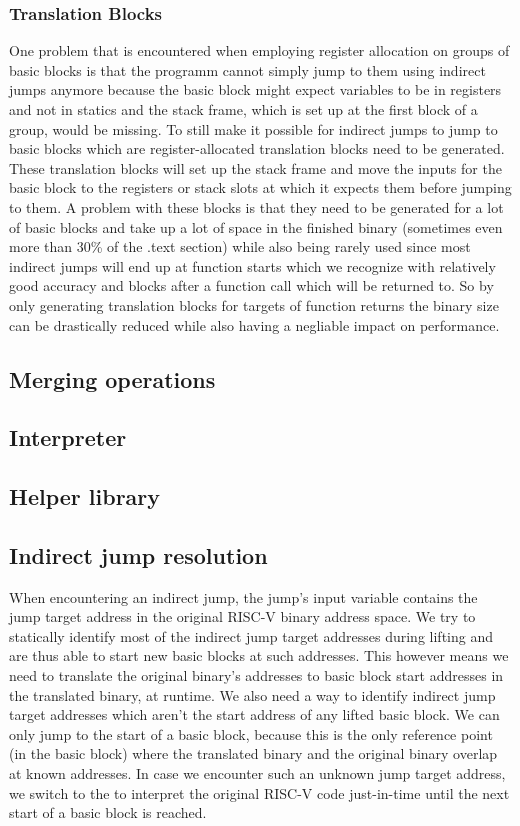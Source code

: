 \documentclass[course=eragp]{aspdoc}
\begin{document}
\subsubsection{Translation Blocks}
One problem that is encountered when employing register allocation on groups of basic blocks is that the programm cannot simply jump to them using indirect jumps anymore because the basic block might expect variables to be in registers
and not in statics and the stack frame, which is set up at the first block of a group, would be missing. To still make it possible for indirect jumps to jump to basic blocks which are register-allocated translation blocks need to be generated.
These translation blocks will set up the stack frame and move the inputs for the basic block to the registers or stack slots at which it expects them before jumping to them.
A problem with these blocks is that they need to be generated for a lot of basic blocks and take up a lot of space in the finished binary (sometimes even more than 30\% of the .text section) while also being rarely used 
since most indirect jumps will end up at function starts which we recognize with relatively good accuracy and blocks after a function call which will be returned to.
So by only generating translation blocks for targets of function returns the binary size can be drastically reduced while also having a negliable impact on performance.
\subsection{Merging operations}
\subsection{Interpreter}\label{interpreter}
\subsection{Helper library}\label{helper}

\subsection{Indirect jump resolution}
When encountering an indirect jump, the jump's input variable contains the jump target address in the
original RISC-V binary address space. We try to statically identify most of the indirect jump target
addresses during lifting and are thus able to start new basic blocks at such addresses. 
This however means we need to translate the original binary's addresses to basic block start
addresses in the translated binary, at runtime. We also need a way to identify
indirect jump target addresses which aren't the start address of any lifted basic block. We can only
jump to the start of a basic block, because this is the only reference point (in the basic block) where the translated
binary and the original binary overlap at known addresses. In case we encounter such an unknown jump
target address, we switch to the  to interpret the original RISC-V code
just-in-time until the next start of a basic block is reached.
\end{document}
